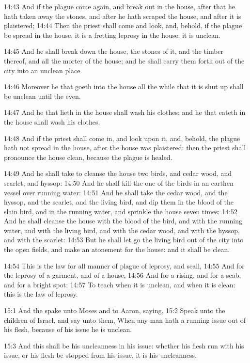 14:43 And if the plague come again, and break out in the house, after
that he hath taken away the stones, and after he hath scraped the
house, and after it is plaistered; 14:44 Then the priest shall come
and look, and, behold, if the plague be spread in the house, it is a
fretting leprosy in the house; it is unclean.

14:45 And he shall break down the house, the stones of it, and the
timber thereof, and all the morter of the house; and he shall carry
them forth out of the city into an unclean place.

14:46 Moreover he that goeth into the house all the while that it is
shut up shall be unclean until the even.

14:47 And he that lieth in the house shall wash his clothes; and he
that eateth in the house shall wash his clothes.

14:48 And if the priest shall come in, and look upon it, and, behold,
the plague hath not spread in the house, after the house was
plaistered: then the priest shall pronounce the house clean, because
the plague is healed.

14:49 And he shall take to cleanse the house two birds, and cedar
wood, and scarlet, and hyssop: 14:50 And he shall kill the one of the
birds in an earthen vessel over running water: 14:51 And he shall take
the cedar wood, and the hyssop, and the scarlet, and the living bird,
and dip them in the blood of the slain bird, and in the running water,
and sprinkle the house seven times: 14:52 And he shall cleanse the
house with the blood of the bird, and with the running water, and with
the living bird, and with the cedar wood, and with the hyssop, and
with the scarlet: 14:53 But he shall let go the living bird out of the
city into the open fields, and make an atonement for the house: and it
shall be clean.

14:54 This is the law for all manner of plague of leprosy, and scall,
14:55 And for the leprosy of a garment, and of a house, 14:56 And for
a rising, and for a scab, and for a bright spot: 14:57 To teach when
it is unclean, and when it is clean: this is the law of leprosy.

15:1 And the \LORD spake unto Moses and to Aaron, saying, 15:2 Speak
unto the children of Israel, and say unto them, When any man hath a
running issue out of his flesh, because of his issue he is unclean.

15:3 And this shall be his uncleanness in his issue: whether his flesh
run with his issue, or his flesh be stopped from his issue, it is his
uncleanness.

